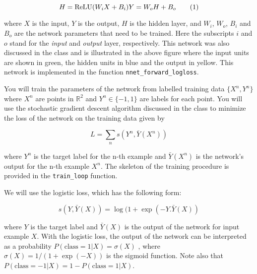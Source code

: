 \documentclass[11pt]{article}
\begin{document}
\begin{equation}
H=\text{ReLU}(W_i X+B_i)\\
Y=W_oH+B_o
\tag{1}
\end{equation}

where \(X\) is the input, \(Y\) is the output, \(H\) is the hidden
layer, and \(W_i\), \(W_o\), \(B_i\) and \(B_o\) are the network
parameters that need to be trained. Here the subscripts \(i\) and \(o\)
stand for the \emph{input} and \emph{output} layer, respectively. This
network was also discussed in the class and is illustrated in the above
figure where the input units are shown in green, the hidden units in
blue and the output in yellow. This network is implemented in the
function \texttt{nnet\_forward\_logloss}.

You will train the parameters of the network from labelled training data
\(\{X^n,Y^n\}\) where \(X^n\) are points in \(\mathbb{R}^2\) and
\(Y^n\in\{-1,1\}\) are labels for each point. You will use the
stochastic gradient descent algorithm discussed in the class to minimize
the loss of the network on the training data given by

\begin{equation}
L=\sum_n s(Y^n,\bar{Y}(X^n))
\tag{2}
\end{equation}

where \(Y^n\) is the target label for the n-th example and
\(\bar{Y}(X^n)\) is the network's output for the n-th example \(X^n\).
The skeleton of the training procedure is provided in the
\texttt{train\_loop} function.

We will use the logistic loss, which has the following form:

\begin{equation}
s(Y, \bar{Y}(X))=\log(1+\exp(-Y. \bar{Y}(X))
\tag{3}
\end{equation}

where \(Y\) is the target label and \(\bar{Y}(X)\) is the output of the
network for input example \(X\). With the logistic loss, the output of
the network can be interpreted as a probability
\(P(\text{class}=1|X) =\sigma(X)\) , where \(\sigma(X) =1/(1+\exp(-X))\)
is the sigmoid function. Note also that
\(P(\text{class}=-1|X)=1-P(\text{class}=1|X)\).
\end{document}
